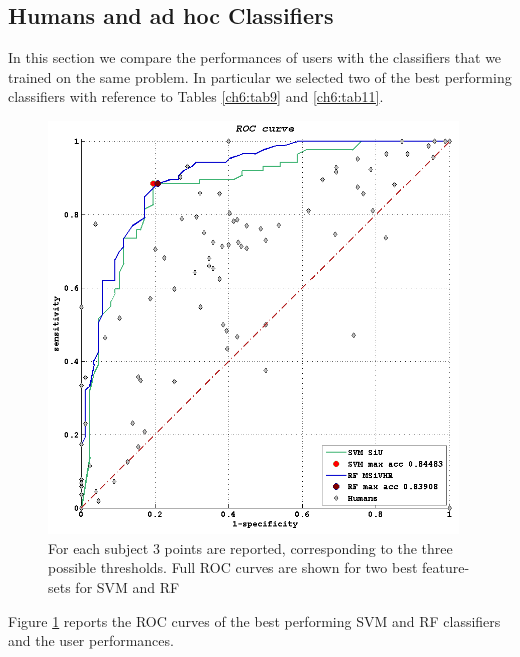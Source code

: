 \vspace{0.5cm}

\subsection{Humans and ad hoc Classifiers}

In this section we compare the performances of users with the classifiers that we trained on the same problem. In particular we selected two of the best performing classifiers with 
reference to Tables \ref{ch6:tab9} and \ref{ch6:tab11}.

\begin{figure}[!htb]
   \begin{center}
    \includegraphics[width=0.97\textwidth]{./images/Ch6/Fig22/class_humans_crop.png}
    \caption[ROC plot humans vs. classifiers]{For each subject 3 points are reported, corresponding to the three possible thresholds.
    Full ROC curves are shown for two best feature-sets for SVM and RF}
    \label{ch6:fig23}
    \end{center}
\end{figure}

Figure \ref{ch6:fig23} reports the \Gls{ROC} curves of the best performing \Gls{SVM} and \Gls{RF} classifiers and the user performances.

\vspace{0.5cm}

